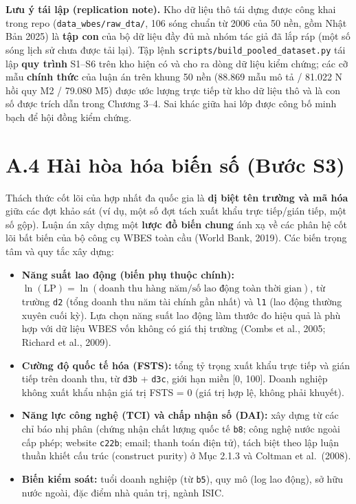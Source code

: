\documentclass[
  a4paper,
  13pt]{extreport}
\providecommand{\tightlist}{%
  \setlength{\itemsep}{0pt}\setlength{\parskip}{0pt}}
\begin{document}
\textbf{Lưu ý tái lập (replication note).} Kho dữ liệu thô tái dựng được
công khai trong repo (\texttt{data\_wbes/raw\_dta/}, 106 sóng chuẩn từ
2006 của 50 nền, gồm Nhật Bản 2025) là \textbf{tập con} của bộ dữ liệu
đầy đủ mà nhóm tác giả đã lắp ráp (một số sóng lịch sử chưa được tải
lại). Tập lệnh \texttt{scripts/build\_pooled\_dataset.py} tái lập
\textbf{quy trình} S1--S6 trên kho hiện có và cho ra dòng dữ liệu kiểm
chứng; các cỡ mẫu \textbf{chính thức} của luận án trên khung 50 nền
(88.869 mẫu mô tả / 81.022 N hồi quy M2 / 79.080 M5) được ước lượng trực
tiếp từ kho dữ liệu thô và là con số được trích dẫn trong Chương 3--4.
Sai khác giữa hai lớp được công bố minh bạch để hội đồng kiểm chứng.

\hypertarget{a.4-huxe0i-huxf2a-huxf3a-biux1ebfn-sux1ed1-bux1b0ux1edbc-s3}{%
\section{A.4 Hài hòa hóa biến số (Bước
S3)}\label{a.4-huxe0i-huxf2a-huxf3a-biux1ebfn-sux1ed1-bux1b0ux1edbc-s3}}

Thách thức cốt lõi của hợp nhất đa quốc gia là \textbf{dị biệt tên
trường và mã hóa} giữa các đợt khảo sát (ví dụ, một số đợt tách xuất
khẩu trực tiếp/gián tiếp, một số gộp). Luận án xây dựng một \textbf{lược
đồ biến chung} ánh xạ về các phân hệ cốt lõi bất biến của bộ công cụ
WBES toàn cầu (World Bank, 2019). Các biến trọng tâm và quy tắc xây
dựng:

\begin{itemize}
\tightlist
\item
  \textbf{Năng suất lao động (biến phụ thuộc chính):}
  \(\ln(\text{LP}) = \ln(\text{doanh thu hàng năm} / \text{số lao động toàn thời gian})\),
  từ trường \texttt{d2} (tổng doanh thu năm tài chính gần nhất) và
  \texttt{l1} (lao động thường xuyên cuối kỳ). Lựa chọn năng suất lao
  động làm thước đo hiệu quả là phù hợp với dữ liệu WBES vốn không có
  giá thị trường (Combs et al., 2005; Richard et al., 2009).
\item
  \textbf{Cường độ quốc tế hóa (FSTS):} tổng tỷ trọng xuất khẩu trực
  tiếp và gián tiếp trên doanh thu, từ \texttt{d3b} + \texttt{d3c}, giới
  hạn miền {[}0, 100{]}. Doanh nghiệp không xuất khẩu nhận giá trị FSTS
  = 0 (giá trị hợp lệ, không phải khuyết).
\item
  \textbf{Năng lực công nghệ (TCI) và chấp nhận số (DAI):} xây dựng từ
  các chỉ báo nhị phân (chứng nhận chất lượng quốc tế \texttt{b8}; công
  nghệ nước ngoài cấp phép; website \texttt{c22b}; email; thanh toán
  điện tử), tách biệt theo lập luận thuần khiết cấu trúc (construct
  purity) ở Mục 2.1.3 và Coltman et al.~(2008).
\item
  \textbf{Biến kiểm soát:} tuổi doanh nghiệp (từ \texttt{b5}), quy mô
  (log lao động), sở hữu nước ngoài, đặc điểm nhà quản trị, ngành ISIC.
\end{itemize}
\end{document}
